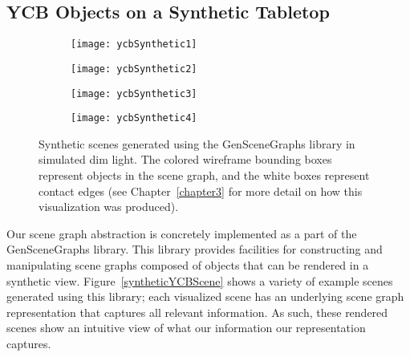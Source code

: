 \subsection{YCB Objects on a Synthetic Tabletop}
\begin{figure}[h]
  \begin{subfigure}[b]{0.45\textwidth}
    \centering
    \texttt{[image: ycbSynthetic1]}
  \end{subfigure}%
  \begin{subfigure}[b]{0.45\textwidth}
    \centering
    \texttt{[image: ycbSynthetic2]}
  \end{subfigure}
  \begin{subfigure}[b]{0.45\textwidth}
    \centering
    \texttt{[image: ycbSynthetic3]}
  \end{subfigure}%
  \begin{subfigure}[b]{0.45\textwidth}
    \centering
    \texttt{[image: ycbSynthetic4]}
  \end{subfigure}
  \caption{
    Synthetic scenes generated using the GenSceneGraphs library in simulated dim light.
    The colored wireframe bounding boxes represent objects in the scene graph, and the white boxes represent contact edges (see Chapter~\ref{chapter3} for more detail on how this visualization was produced).
  }
  \label{fig:syntheticYCBScene}
\end{figure}

Our scene graph abstraction is concretely implemented as a part of the GenSceneGraphs library.
This library provides facilities for constructing and manipulating scene graphs composed of objects that can be rendered in a synthetic view.
Figure~\ref{syntheticYCBScene} shows a variety of example scenes generated using this library; each visualized scene has an underlying scene graph representation that captures all relevant information.
As such, these rendered scenes show an intuitive view of what our information our representation captures.


